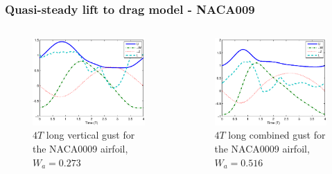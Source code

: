 \documentclass[compress]{beamer}
\begin{document}
\begin{frame}
  \frametitle{Quasi-steady lift to drag model - NACA009}
  \begin{columns}
    \begin{figure}
      \begin{center}
	\includegraphics[width=1\textwidth]{./Figures/Windtype=1_Tg=4_Wg=0p273_LUTNACA0009_alphamax=5_dalphadt=50.eps}
      \end{center}
      \caption{$4T$ long vertical gust for the NACA0009 airfoil, $W_a=0.273$}
    \end{figure}
    \begin{figure}[h]
      \begin{center}
	\includegraphics[width=1\textwidth]{./Figures/Windtype=3_Tg=4_Wg=0p516_LUTNACA0009_alphamax=12_dalphadt=50.eps}
      \end{center}
      \caption{$4T$ long combined gust for the NACA0009 airfoil, $W_a=0.516$}
    \end{figure}
  \end{columns} %
\end{frame}
\end{document}

